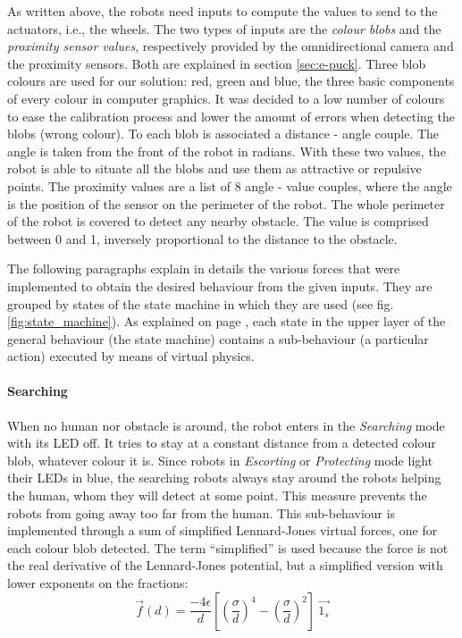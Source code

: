 \documentclass[oneside, a4paper, 12pt]{memoir}
\begin{document}
	As written above, the robots need inputs to compute the values to send to the actuators, i.e., the wheels. The two types of inputs are the \emph{colour blobs} and the \emph{proximity sensor values}, respectively provided by the omnidirectional camera and the proximity sensors. Both are explained in section \ref{sec:e-puck}. Three blob colours are used for our solution: red, green and blue, the three basic components of every colour in computer graphics. It was decided to a low number of colours to ease the calibration process and lower the amount of errors when detecting the blobs (wrong colour). To each blob is associated a distance - angle couple. The angle is taken from the front of the robot in radians. With these two values, the robot is able to situate all the blobs and use them as attractive or repulsive points. The proximity values are a list of 8 angle - value couples, where the angle is the position of the sensor on the perimeter of the robot. The whole perimeter of the robot is covered to detect any nearby obstacle. The value is comprised between 0 and 1, inversely proportional to the distance to the obstacle.
	
	The following paragraphs explain in details the various forces that were implemented to obtain the desired behaviour from the given inputs. They are grouped by states of the state machine in which they are used (see fig. \ref{fig:state_machine}). As explained on page \pageref{def:implementation_layers}, each state in the upper layer of the general behaviour (the state machine) contains a sub-behaviour (a particular action) executed by means of virtual physics.
		
			\paragraph{Searching}
			
				When no human nor obstacle is around, the robot enters in the \emph{Searching} mode with its LED off. It tries to stay at a constant distance from a detected colour blob, whatever colour it is. Since robots in \emph{Escorting} or \emph{Protecting} mode light their LEDs in blue, the searching robots always stay around the robots helping the human, whom they will detect at some point. This measure prevents the robots from going away too far from the human. This sub-behaviour is implemented through a sum of simplified Lennard-Jones virtual forces, one for each colour blob detected. The term \enquote{simplified} is used because the force is not the real derivative of the Lennard-Jones potential, but a simplified version with lower exponents on the fractions:%
				\begin{equation}
					\vec{f}(d) = \frac{-4\epsilon}{d} \left[ \left(\frac{\sigma}{d}\right)^{4} - \left(\frac{\sigma}{d}\right)^2 \right] ~\vec{1_s}
					\label{eq:lennard-jones_force_simplified}
				\end{equation}
				
\end{document}
